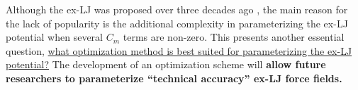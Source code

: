 \documentclass[12pt,a4paper]{article}
\begin{document}
%






Although the ex-LJ was proposed over three decades ago \cite{Kalos1972}, the main reason for the lack of popularity is the additional complexity in parameterizing the ex-LJ potential when several $C_m$ terms are non-zero. This presents another essential question, \ul{what optimization method is best suited for parameterizing the ex-LJ potential?} The development of an optimization scheme will \textbf{allow future researchers to parameterize ``technical accuracy'' ex-LJ force fields.}


% 
\end{document}
